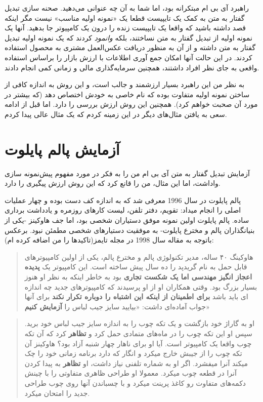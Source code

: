 راهبرد آی بی ام مبتکرانه بود، اما شما به آن چه عنوانی می‌دهید. صحنه سازی
تبدیل گفتار به متن به کمک یک تایپیست قطعا یک «نمونه اولیه مناسب» نیست
مگر اینکه قصد داشته باشید که واقعا یک تایپیست زنده را درون یک کامپیوتر
جا بدهید. آنها یک نمونه اولیه از تبدیل گفتار به متن نساختند، بلکه
\emph{وانمود} کردند که یک نمونه اولیه تبدیل گفتار به متن داشته و از آن
به منظور دریافت عکس‌العمل مشتری به محصول استفاده کردند. در این حالت آنها
امکان جمع آوری اطلاعات با ارزش بازار را براساس استفاده واقعی به جای نظر
افراد داشتند، همچنین سرمایه‌گذاری مالی و زمانی کمی انجام دادند.

به نظر من این راهبرد بسیار ارزشمند و جالب است، و این روش به اندازه کافی
از ساختن نمونه اولیه متفاوت بوده که نام خاصی به خودش اختصاص دهد (که
بیشتر در مورد آن صحبت خواهم کرد). همچنین این روش ارزش بررسی را دارد. اما
قبل از ادامه سعی به یافتن مثال‌های دیگر در این زمینه کردم که یک مثال
عالی پیدا کردم.

\section{آزمایش پالم
پایلوت}\label{ux622ux632ux645ux627ux6ccux634-ux67eux627ux644ux645-ux67eux627ux6ccux644ux648ux62a}

آزمایش تبدیل گفتار به متن آی بی ام من را به فکر در مورد مفهوم پیش‌نمونه
سازی واداشت، اما این مثال، من را قانع کرد که این روش ارزش پیگیری را
دارد.

پالم پایلوت در سال 1996 معرفی شد که به اندازه کف دست بوده و چهار عملیات
اصلی را انجام میداد: تقویم، دفتر تلفن، لیست کارهای روزمره و یادداشت
برداری ساده. پالم پایلوت اولین نمونه موفق دستیاران شخصی بود، اما جف
هاوکینز -یکی از بنیانگذاران پالم و مخترع پایلوت- به موفقیت دستیارهای
شخصی مطمئن نبود. برعکس باتوجه به مقاله سال 1998 در مجله تایمز(تاکیدها را
من اضافه کرده ام):

\begin{quote}
هاوکینگ ۴۰ ساله، مدیر تکنولوژی پالم و مخترع پالم، یکی از اولین
کامپیوترهای قابل حمل به نام گریدپد را ده سال پیش ساخته است. این کامپیوتر
یک \textbf{پدیده اعجاز انگیز مهندسی اما یک شکست تجاری} بود به خاطر اینکه
به نظر او هنوز بسیار بزرگ بود. وقتی همکاران او از او پرسیدند که
کامپیوترهای جدید چه اندازه ای باید باشد \textbf{برای اطمینان از اینکه
این اشتباه را دوباره تکرار نکند} برای آنها جواب آماده‌ای داشت: «بیایید
سایز جیب لباس را \textbf{آزمایش کنیم}»
\end{quote}

\begin{quote}
او به گاراژ خود بازگشت و یک تکه چوب را به اندازه سایز جیب لباس خود برید.
سپس او این تکه چوب را در ماه‌های متمادی حمل کرد و \textbf{تظاهر} کرد که
آن تکه چوب واقعا یک کامپیوتر است. آیا او برای ناهار چهار شنبه آزاد بود؟
هاوکینز آن تکه چوب را از جیبش خارج میکرد و انگار که دارد برنامه زمانی
خود را چک میکند آنرا میفشرد. اگر او به شماره تلفنی نیاز داشت، او
\textbf{تظاهر} به پیدا کردن آنرا در قطعه چوب میکرد. معمولا او طراحی
ظاهری متفاوتی را با چینش دکمه‌های متفاوت رو کاغذ پرینت میکرد و با
چسباندن آنها روی چوب طراحی جدید را امتحان میکرد.
\end{quote}

